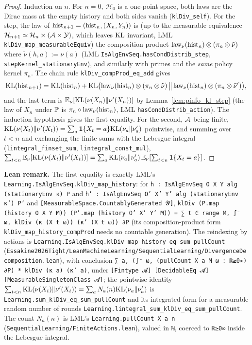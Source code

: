 \begin{proof}
\leanok
Induction on $n$. For $n = 0$, $\mathcal H_0$ is a one-point space, both laws are the Dirac
mass at the empty history and both sides vanish (\texttt{klDiv\_self}). For the step, the law
of $\mathrm{hist}_{n+1} = (\mathrm{hist}_n, (X_n, Y_n))$ is (up to the measurable equivalence
$\mathcal H_{n+1} \simeq \mathcal H_n \times (\mathcal{A}\times\mathcal Y)$, which leaves $\mathrm{KL}$ invariant,
LML \texttt{klDiv\_map\_measurableEquiv}) the composition-product
$\mathrm{law}_\nu(\mathrm{hist}_n) \otimes (\pi_n \otimes \tilde\nu)$ where $\tilde\nu(h, a) := \nu(a)$
(LML \texttt{IsAlgEnvSeq.hasCondDistrib\_step}, \texttt{stepKernel\_stationaryEnv}), and
similarly with primes and the \emph{same} policy kernel $\pi_n$. The chain rule
\texttt{klDiv\_compProd\_eq\_add} gives
\[
  \mathrm{KL}(\mathrm{hist}_{n+1}) = \mathrm{KL}(\mathrm{hist}_n)
  + \mathrm{KL}\big(\mathrm{law}_\nu(\mathrm{hist}_n)\otimes(\pi_n\otimes\tilde\nu)\,\big\|\,
      \mathrm{law}_\nu(\mathrm{hist}_n)\otimes(\pi_n\otimes\tilde\nu')\big),
\]
and the last term is $\mathbb{E}_\nu[\mathrm{KL}(\nu(X_n)\|\nu'(X_n))]$ by Lemma~\ref{lem:pinfo_kl_step} (the
law of $X_n$ under $\mathbb{P}$ is $\pi_n \circ \mathrm{law}_\nu(\mathrm{hist}_n)$, LML
\texttt{hasCondDistrib\_action}). The induction hypothesis gives the first equality. For the
second, $\mathcal{A}$ being finite,
$\mathrm{KL}(\nu(X_t)\|\nu'(X_t)) = \sum_a \mathbf{1}\{X_t = a\}\mathrm{KL}(\nu_a\|\nu'_a)$ pointwise, and summing
over $t < n$ and exchanging the finite sums with the Lebesgue integral
(\texttt{lintegral\_finset\_sum}, \texttt{lintegral\_const\_mul}),
$\sum_{t<n}\mathbb{E}_\nu[\mathrm{KL}(\nu(X_t)\|\nu'(X_t))] = \sum_a \mathrm{KL}(\nu_a\|\nu'_a)\,\mathbb{E}_\nu[\sum_{t<n}\mathbf{1}\{X_t = a\}]$.
\end{proof}

\textbf{Lean remark.} The first equality is exactly LML's
\texttt{Learning.IsAlgEnvSeq.klDiv\_map\_history}: for \texttt{h : IsAlgEnvSeq O X Y alg
(stationaryEnv κ) P} and \texttt{h' : IsAlgEnvSeq O' X' Y' alg (stationaryEnv κ') P'} and
\texttt{[MeasurableSpace.CountablyGenerated 𝓨]}, \texttt{klDiv (P.map (history O X Y M))
(P'.map (history O' X' Y' M)) = ∑ t ∈ range M, ∫⁻ ω, klDiv (κ (X t ω)) (κ' (X t ω)) ∂P}
(its composition-product form \texttt{klDiv\_map\_history\_compProd} needs no countable
generation). The reindexing by actions is
\texttt{Learning.IsAlgEnvSeq.klDiv\_map\_history\_eq\_sum\_pullCount}
(\texttt{Essakine2026Tight/LeanMachineLearning/SequentialLearning/DivergenceDecomposition.lean}),
with conclusion \texttt{∑ a, (∫⁻ ω, (pullCount X a M ω : ℝ≥0∞) ∂P) * klDiv (κ a) (κ' a)}, under
\texttt{[Fintype 𝓐] [DecidableEq 𝓐] [MeasurableSingletonClass 𝓐]}; the pointwise identity
$\sum_{t<n}\mathrm{KL}(\nu(X_t)\|\nu'(X_t)) = \sum_a N_a(n)\mathrm{KL}(\nu_a\|\nu'_a)$ is
\texttt{Learning.sum\_klDiv\_eq\_sum\_pullCount} and its integrated form for a measurable random
number of rounds \texttt{Learning.lintegral\_sum\_klDiv\_eq\_sum\_pullCount}. The count $N_a(n)$ is
LML's \texttt{Learning.pullCount X a n} (\texttt{SequentialLearning/FiniteActions.lean}), valued in
\texttt{ℕ}, coerced to \texttt{ℝ≥0∞} inside the Lebesgue integral.

